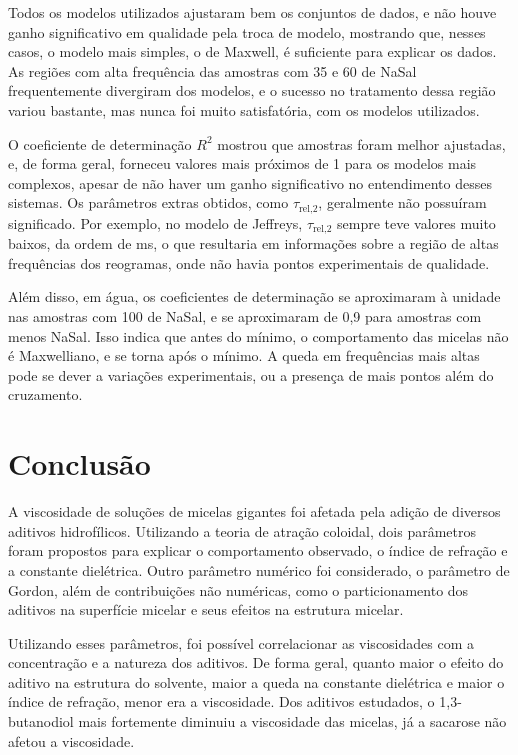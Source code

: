 		Todos os modelos utilizados ajustaram bem os conjuntos de dados, e não houve ganho significativo em qualidade pela troca de modelo, mostrando que, nesses casos, o modelo mais simples, o de Maxwell, é suficiente para explicar os dados. As regiões com alta frequência das amostras com 35 e 60 \mM{} de NaSal frequentemente divergiram dos modelos, e o sucesso no tratamento dessa região variou bastante, mas nunca foi muito satisfatória, com os modelos utilizados.
		
		O coeficiente de determinação \(R^2\) mostrou que amostras foram melhor ajustadas, e, de forma geral, forneceu valores mais próximos de 1 para os modelos mais complexos, apesar de não haver um ganho significativo no entendimento desses sistemas. Os parâmetros extras obtidos, como \(\tau_{\textrm{rel,2}}\), geralmente não possuíram significado. Por exemplo, no modelo de Jeffreys, \(\tau_{\textrm{rel,2}}\) sempre teve valores muito baixos, da ordem de ms, o que resultaria em informações sobre a região de altas frequências dos reogramas, onde não havia pontos experimentais de qualidade.
		
		Além disso, em água, os coeficientes de determinação se aproximaram à unidade nas amostras com 100 \mM{} de NaSal, e se aproximaram de 0,9 para amostras com menos NaSal. Isso indica que antes do mínimo, o comportamento das micelas não é Maxwelliano, e se torna após o mínimo. A queda em frequências mais altas pode se dever a variações experimentais, ou a presença de mais pontos além do cruzamento.

	\chapter{Conclusão} 
	
		A viscosidade de soluções de micelas gigantes foi afetada pela adição de diversos aditivos hidrofílicos. Utilizando a teoria de atração coloidal,  dois parâmetros foram propostos para explicar o comportamento observado, o índice de refração e a constante dielétrica. Outro parâmetro numérico foi considerado, o parâmetro de Gordon, além de contribuições não numéricas, como o particionamento dos aditivos na superfície micelar e seus efeitos na estrutura micelar.
		
		Utilizando esses parâmetros, foi possível correlacionar as viscosidades com a concentração e a natureza dos aditivos. De forma geral, quanto maior o efeito do aditivo na estrutura do solvente, maior a queda na constante dielétrica e maior o índice de refração, menor era a viscosidade. Dos aditivos estudados, o 1,3-butanodiol mais fortemente diminuiu a viscosidade das micelas, já a sacarose não afetou a viscosidade.
		
